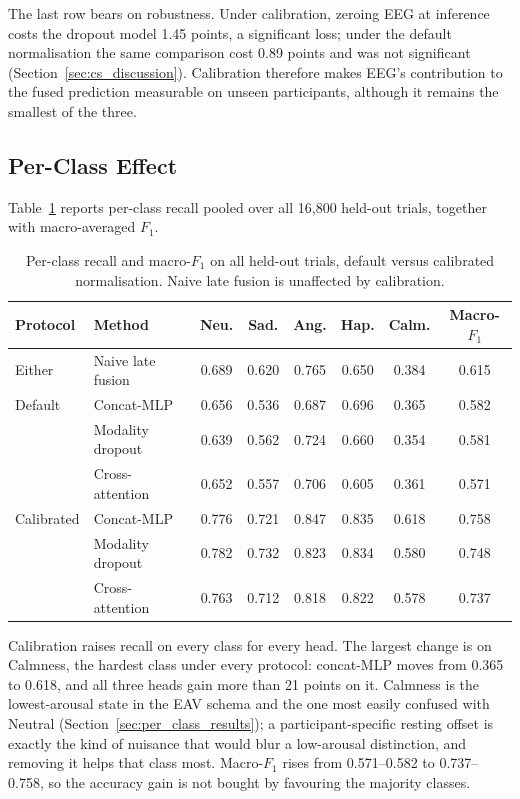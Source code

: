 The last row bears on robustness. Under calibration, zeroing EEG at inference costs
the dropout model 1.45 points, a significant loss; under the default normalisation
the same comparison cost 0.89 points and was not significant
(Section~\ref{sec:cs_discussion}). Calibration therefore makes EEG's contribution to
the fused prediction measurable on unseen participants, although it remains the
smallest of the three.

\subsection{Per-Class Effect}
\label{sec:cal_perclass}

Table~\ref{tab:cal_perclass} reports per-class recall pooled over all 16{,}800
held-out trials, together with macro-averaged $F_1$.

\begin{table}[htbp]
\centering
\small
\caption{Per-class recall and macro-$F_1$ on all held-out trials, default versus
calibrated normalisation. Naive late fusion is unaffected by calibration.}
\label{tab:cal_perclass}
\begin{tabular}{llcccccc}
\hline
\textbf{Protocol} & \textbf{Method} & \textbf{Neu.} & \textbf{Sad.} & \textbf{Ang.} & \textbf{Hap.} & \textbf{Calm.} & \textbf{Macro-$F_1$} \\
\hline
Either     & Naive late fusion & 0.689 & 0.620 & 0.765 & 0.650 & 0.384 & 0.615 \\
\hline
Default    & Concat-MLP        & 0.656 & 0.536 & 0.687 & 0.696 & 0.365 & 0.582 \\
           & Modality dropout  & 0.639 & 0.562 & 0.724 & 0.660 & 0.354 & 0.581 \\
           & Cross-attention   & 0.652 & 0.557 & 0.706 & 0.605 & 0.361 & 0.571 \\
\hline
Calibrated & Concat-MLP        & 0.776 & 0.721 & 0.847 & 0.835 & 0.618 & 0.758 \\
           & Modality dropout  & 0.782 & 0.732 & 0.823 & 0.834 & 0.580 & 0.748 \\
           & Cross-attention   & 0.763 & 0.712 & 0.818 & 0.822 & 0.578 & 0.737 \\
\hline
\end{tabular}
\end{table}

Calibration raises recall on every class for every head. The largest change is on
Calmness, the hardest class under every protocol: concat-MLP moves from 0.365 to
0.618, and all three heads gain more than 21 points on it. Calmness is the
lowest-arousal state in the EAV schema and the one most easily confused with Neutral
(Section~\ref{sec:per_class_results}); a participant-specific resting offset is
exactly the kind of nuisance that would blur a low-arousal distinction, and removing
it helps that class most. Macro-$F_1$ rises from 0.571--0.582 to 0.737--0.758, so the
accuracy gain is not bought by favouring the majority classes.

